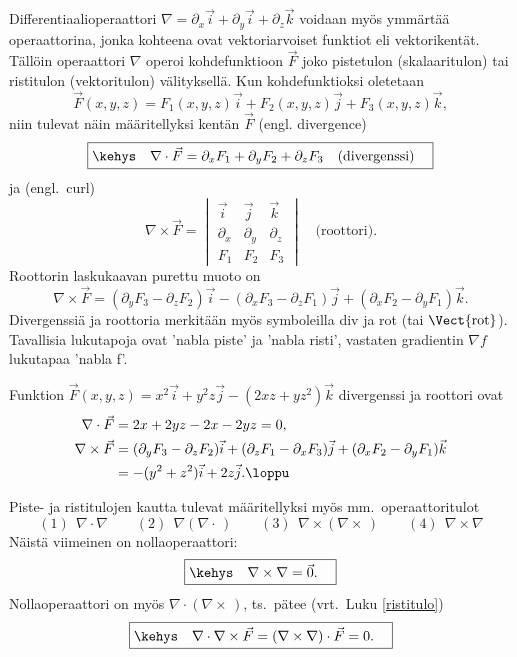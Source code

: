Differentiaalioperaattori $\nabla=\partial_x\vec i+\partial_y\vec i+\partial_z\vec k$ voidaan 
myös ymmärtää operaattorina, jonka kohteena ovat vektoriarvoiset funktiot eli vektorikentät. 
Tällöin operaattori $\nabla$ operoi kohdefunktioon $\vec F$ joko pistetulon (skalaaritulon) tai
ristitulon (vektoritulon) välityksellä. Kun kohdefunktioksi oletetaan
\[
\vec F(x,y,z)=F_1(x,y,z)\vec i + F_2(x,y,z)\vec j + F_3(x,y,z)\vec k,
\]
niin tulevat näin määritellyksi kentän $\vec F$  (engl. divergence)
\[
\boxed{\kehys\quad \nabla\cdot\vec F
           =\partial_x F_1+\partial_y F_2+\partial_z F_3 \quad\text{(divergenssi)}\quad}
\]
ja  (engl.\ curl)
\[
\boxed{\quad \nabla\times\vec F=\begin{vmatrix}
\vec i & \vec j & \vec k \\
\partial_x & \partial_y & \partial_z \\
F_1 & F_2 & F_3
\end{vmatrix} \quad\text{(roottori)}.\quad}
\]
Roottorin laskukaavan purettu muoto on
\[ \nabla \times \vec F = (\partial_y F_3 - \partial_z F_2)\vec i 
                        - (\partial_x F_3 - \partial_z F_1)\vec j
                        + (\partial_x F_2 - \partial_y F_1)\vec k. 
\]
Divergenssiä ja roottoria merkitään myös symboleilla div ja rot (tai $\Vect{\text{rot}}$). 
Tavallisia lukutapoja ovat 'nabla piste' ja 'nabla risti', vastaten gradientin $\nabla f$ 
lukutapaa 'nabla f'.
\begin{Exa} Funktion $\vec F(x,y,z)=x^2\vec i+y^2z\vec j-(2xz+yz^2)\vec k$ divergenssi ja 
roottori ovat
\begin{align*}
\nabla\cdot\vec F  &= 2x+2yz-2x-2yz=0, \\
\nabla\times\vec F &= (\partial_y F_3-\partial_z F_2)\vec i
                     +(\partial_z F_1-\partial_x F_3)\vec j
                     +(\partial_x F_2-\partial_y F_1)\vec k \\
                   &= -(y^2+z^2)\vec i+2z\vec j. \loppu
\end{align*}
\end{Exa}
Piste- ja ristitulojen kautta tulevat määritellyksi myös mm.\ operaattoritulot 
\[
(1)\ \ \nabla\cdot\nabla \qquad (2)\ \ \nabla(\nabla\cdot\,) \qquad
(3)\ \ \nabla\times(\nabla\times\,) \qquad (4)\ \ \nabla\times\nabla
\]
Näistä viimeinen on nollaoperaattori:
\[
\boxed{\kehys\quad \nabla\times\nabla=\vec 0. \quad }
\]
Nollaoperaattori on myös $\nabla\cdot(\nabla\times\,)$, ts.\ pätee (vrt.\ Luku \ref{ristitulo})
\[
\boxed{\kehys\quad \nabla\cdot\nabla\times\vec F = (\nabla\times\nabla)\cdot\vec F = 0. \quad}
\]
